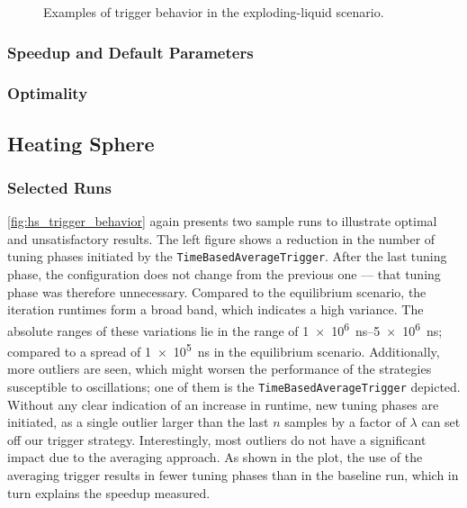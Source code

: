 \begin{figure}[htpb]
\begin{subfigure}[t]{0.5\textwidth}
		\vspace*{-1cm}
	\end{subfigure}
	\caption{Examples of trigger behavior in the exploding-liquid scenario.}
	\label{fig:expl_trigger_behavior}
\end{figure}

\subsubsection{Speedup and Default Parameters}
\subsubsection{Optimality}


\subsection{Heating Sphere}
\subsubsection{Selected Runs}
\autoref{fig:hs_trigger_behavior} again presents two sample runs to illustrate optimal and unsatisfactory results. The left figure shows a reduction in the number of tuning phases initiated by the \texttt{TimeBasedAverageTrigger}. After the last tuning phase, the configuration does not change from the previous one --- that tuning phase was therefore unnecessary. Compared to the equilibrium scenario, the iteration runtimes form a broad band, which indicates a high variance. The absolute ranges of these variations lie in the range of \SIrange{1e6}{5e6}{\nano\second}; compared to a spread of \qty{1e5}{\nano\second} in the equilibrium scenario. Additionally, more outliers are seen, which might worsen the performance of the strategies susceptible to oscillations; one of them is the \texttt{TimeBasedAverageTrigger} depicted. Without any clear indication of an increase in runtime, new tuning phases are initiated, as a single outlier larger than the last $n$ samples by a factor of $\lambda$ can set off our trigger strategy. Interestingly, most outliers do not have a significant impact due to the averaging approach. As shown in the plot, the use of the averaging trigger results in fewer tuning phases than in the baseline run, which in turn explains the speedup measured.

